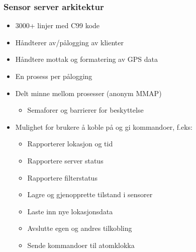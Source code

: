 \documentclass[xcolor=table]{beamer}
\begin{document}
\begin{frame}
  \frametitle{Sensor server arkitektur}
  \begin{itemize}
    \item 3000+ linjer med C99 kode
    \item Håndterer av/pålogging av klienter
    \item Håndtere mottak og formatering av GPS data
    \item En prosess per pålogging
    \item Delt minne mellom prosesser (anonym MMAP)
      \begin{itemize}
        \item Semaforer og barrierer for beskyttelse
      \end{itemize}
    \item Mulighet for brukere å koble på og gi kommandoer, f.eks:
      \begin{itemize}
        \item Rapporterer lokasjon og tid
        \item Rapportere server status
        \item Rapportere filterstatus
        \item Lagre og gjenopprette tilstand i sensorer
        \item Laste inn nye lokasjonsdata
        \item Avslutte egen og andres tilkobling
        \item Sende kommandoer til atomklokka 
      \end{itemize}
  \end{itemize}
\end{frame}
\end{document}
